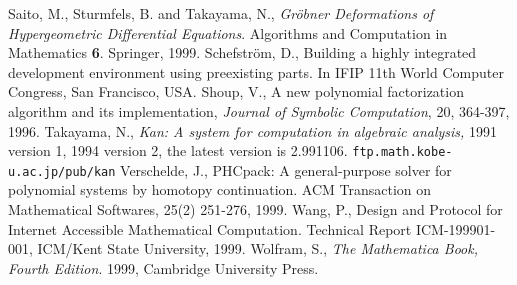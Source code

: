 \begin{thebibliography}{X}
Saito, M., Sturmfels, B. and Takayama, N.,
{\it Gr\"obner Deformations of Hypergeometric Differential Equations}.
Algorithms and Computation in Mathematics {\bf 6}. Springer, 1999.
Schefstr\"om, D.,
Building a highly integrated development environment using
preexisting parts.
In IFIP 11th World Computer Congress, San Francisco, USA.
Shoup, V., 
A new polynomial factorization algorithm and 
its implementation,
{\sl Journal of Symbolic Computation}, 20, 364-397, 1996.
	Takayama, N.,
	{\em Kan: A system for computation in
	algebraic analysis,} 1991 version 1,
        1994 version 2, the latest version is 2.991106. 
	{\tt \small ftp.math.kobe-u.ac.jp/pub/kan}
Verschelde, J.,
PHCpack: A general-purpose solver for polynomial systems by
homotopy continuation.  ACM Transaction on Mathematical Softwares, 25(2) 
251-276, 1999.
Wang, P.,
Design and Protocol for Internet Accessible Mathematical Computation.
Technical Report ICM-199901-001, ICM/Kent State University, 1999.
Wolfram, S.,
{\it The Mathematica Book, Fourth Edition}.
1999, Cambridge University Press.
\end{thebibliography}
